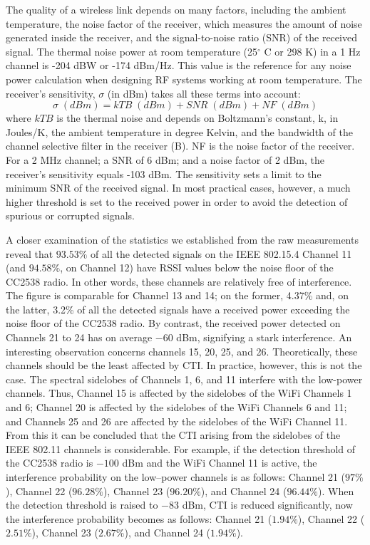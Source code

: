 The quality of a wireless link depends on many factors, including the ambient temperature, the noise factor of the receiver, which measures the amount of noise generated inside the receiver, and the signal-to-noise ratio (SNR) of the received signal. The thermal noise power at room temperature (25$^{\circ}$ C or 298 K) in a 1 Hz channel is -204 dBW or -174 dBm/Hz. This value is the reference for any noise power calculation when designing RF systems working at room temperature. The receiver's sensitivity, $\sigma$ (in dBm) takes all these terms into account:
\begin{equation}
   \label{eq:sensitivity}
  \sigma \; (dBm)  = kTB \; (dBm) + SNR \; (dBm) + NF \; (dBm) 
\end{equation}
where $kTB$ is the thermal noise and depends on Boltzmann’s constant, k, in Joules/K, the ambient temperature in degree Kelvin, and the bandwidth of the channel selective filter in the receiver (B). NF is the noise factor of the receiver. For a 2 MHz channel; a SNR of 6 dBm; and a noise factor of 2 dBm, the receiver's sensitivity equals -103 dBm. The sensitivity sets a limit to the minimum SNR of the received signal. In most practical cases, however, a much higher threshold is set to the received power in order to avoid the detection of spurious or corrupted signals.             

A closer examination of the statistics we established from the raw measurements reveal that $93.53\%$ of all the detected signals on the IEEE 802.15.4 Channel 11 (and $94.58\% $, on Channel 12) have RSSI values below the noise floor of the CC2538 radio. In other words, these channels are relatively free of interference. The figure is comparable for Channel 13 and 14; on the former, 4.37\%  and, on the latter, 3.2\% of all the detected signals have a received power exceeding the noise floor of the CC2538 radio. By contrast, the received power detected on Channels  21 to 24 has on average $-60$ dBm, signifying a stark interference. An interesting observation concerns channels 15, 20, 25, and 26. Theoretically, these channels should be the least affected by CTI. In practice, however, this is not the case. The spectral sidelobes of Channels 1, 6, and 11 interfere with the low-power channels. Thus, Channel 15 is affected by the sidelobes of the WiFi Channels 1 and 6; Channel 20 is affected by the sidelobes of the WiFi Channels 6 and 11; and Channels 25 and 26 are affected by the sidelobes of the WiFi Channel 11. From this it can be concluded that the CTI arising from the sidelobes of the IEEE 802.11 channels is considerable. For example, if the detection threshold of the CC2538 radio is $-100$ dBm and the WiFi Channel 11 is active, the interference probability on the low--power channels is as follows: Channel 21 ($97\%$),  Channel 22 ($96.28\%$), Channel 23 ($96.20\%$), and Channel 24 ($96.44\%$).  When the detection threshold is raised to $-83$ dBm,  CTI is reduced significantly, now the interference probability becomes as follows: Channel 21 ($1.94\%$), Channel 22 ($2.51\%$), Channel 23 ($2.67\%$), and Channel 24 ($1.94\%$). 

